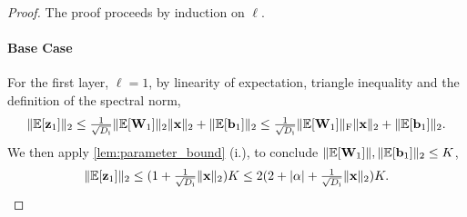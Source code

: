 \documentclass[twoside]{article}
\renewcommand{\ss}[1]{_{\text{#1}}}
\newcommand{\vb}{\mathbf{b}}
\newcommand{\vx}{\mathbf{x}}
\newcommand{\vz}{\mathbf{z}}
\newcommand{\mW}{\mathbf{W}}
\newcommand{\E}{\mathbb{E}}
\renewcommand{\ss}[1]{_{\text{#1}}}        %
\DeclarePairedDelimiter\norm{\|}{\|}             %
\theoremstyle{theoremstyle}
\begin{document}
\begin{proof}
The proof proceeds by induction on $\ell$.
\paragraph{Base Case}
For the first layer, $\ell = 1$, by linearity of expectation, triangle inequality and the definition of the spectral norm,
\begin{equation}
    \norm{\E[\vz_1]}_2 \le \tfrac1{\sqrt{D\ss{i}}}\norm{\E[\mW_1]}\ss{2} \norm{\vx}_2 + \norm{\E[\vb_1]}_2 \le \tfrac1{\sqrt{D\ss{i}}}\norm{\E[\mW_1]}\ss{F} \norm{\vx}_2 + \norm{\E[\vb_1]}_2.
\end{equation}
We then apply
\cref{lem:parameter_bound} (i.), to conclude $\norm{\E[\mW_1]},\norm{\E[\vb_1]}_2 \leq K$,
\begin{equation}
    \norm{\E[\vz_1]}_2 \le (1+ \tfrac{1}{\sqrt{D\ss{i}}}\|\vx\|_2)K \leq 2(2+|\alpha|+\tfrac{1}{\sqrt{D\ss{i}}}\|\vx\|_2)K .
\end{equation}

\end{proof}
\end{document}
